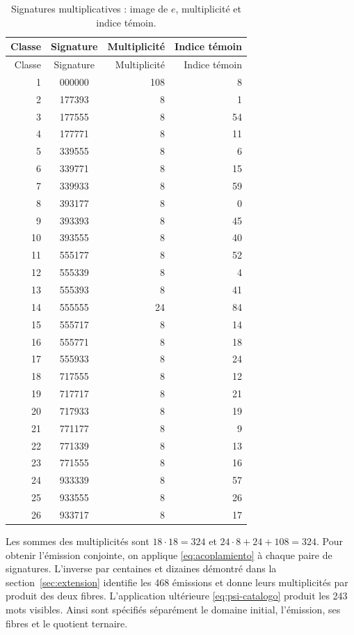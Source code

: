 \begin{longtable}{rcrr}
\caption{Signatures multiplicatives : image de \(e\), multiplicité et indice témoin.}
\label{iv:tabla-firmas-multiplicativas}\\
\toprule
Classe & Signature & Multiplicité & Indice témoin\\
\midrule
\endfirsthead
\toprule
Classe & Signature & Multiplicité & Indice témoin\\
\midrule
\endhead
1&000000&108&8\\
2&177393&8&1\\
3&177555&8&54\\
4&177771&8&11\\
5&339555&8&6\\
6&339771&8&15\\
7&339933&8&59\\
8&393177&8&0\\
9&393393&8&45\\
10&393555&8&40\\
11&555177&8&52\\
12&555339&8&4\\
13&555393&8&41\\
14&555555&24&84\\
15&555717&8&14\\
16&555771&8&18\\
17&555933&8&24\\
18&717555&8&12\\
19&717717&8&21\\
20&717933&8&19\\
21&771177&8&9\\
22&771339&8&13\\
23&771555&8&16\\
24&933339&8&57\\
25&933555&8&26\\
26&933717&8&17\\
\bottomrule
\end{longtable}

Les sommes des multiplicités sont \(18\cdot18=324\) et
\(24\cdot8+24+108=324\). Pour obtenir l’émission conjointe, on applique
\eqref{eq:acoplamiento} à chaque paire de signatures. L’inverse par centaines
et dizaines démontré dans la section~\ref{sec:extension} identifie les 468
émissions et donne leurs multiplicités par produit des deux fibres.
L’application ultérieure \eqref{eq:psi-catalogo} produit les 243
mots visibles. Ainsi sont spécifiés séparément le domaine initial,
l’émission, ses fibres et le quotient ternaire.


